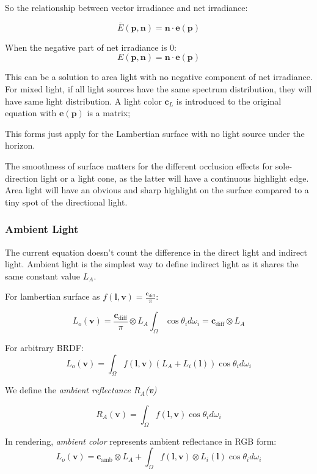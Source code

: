 \documentclass[10pt, a4paper]{article}
\begin{document}
        So the relationship between vector irradiance and net irradiance: 

        $$\overline{E}(\textbf{p}, \textbf{n}) = \textbf{n} \cdot \textbf{e}(\textbf{p})$$

        When the negative part of net irradiance is 0:
        $$E(\textbf{p}, \textbf{n}) = \textbf{n} \cdot \textbf{e}(\textbf{p})$$
        
        This can be a solution to area light with no negative component of net irradiance. For mixed light, if all light sources have the same spectrum distribution, they will have same light distribution. A light color $\textbf{c}_L$ is introduced to the original equation with $\textbf{e}(\textbf{p})$ is a matrix; 

        This forms just apply for the Lambertian surface with no light source under the horizon. 

        The smoothness of surface matters for the different occlusion effects for sole-direction light or a light cone, as the latter will have a continuous highlight edge. Area light will have an obvious and sharp highlight on the surface compared to a tiny spot of the directional light.
    
    \subsubsection{Ambient Light}
        The current equation doesn't count the difference in the direct light and indirect light. Ambient light is the simplest way to define indirect light as it shares the same constant value $L_A$.

        For lambertian surface as $f(\textbf{l}, \textbf{v}) = \frac{\textbf{c}_{\text{diff}}}{\pi}$: 

        $$L_o(\textbf{v}) = \frac{\textbf{c}_{\text{diff}}}{\pi} \otimes L_A\int_{\Omega}\cos{\theta_i}d\omega_i  = \textbf{c}_{\text{diff}} \otimes L_A$$
           
        For arbitrary BRDF: 
        $$
            L_o(\textbf{v}) = \int_{\Omega}f(\textbf{l}, \textbf{v})(L_A + L_i(\textbf{l}))\cos{\theta_i}d\omega_i
        $$

        We define the \emph{ambient reflectance $R_A$(\textbf{v})}

        $$R_A(\textbf{v}) = \int_{\Omega}f(\textbf{l}, \textbf{v})\cos{\theta_i}d\omega_i$$

        In rendering, \emph{ambient color} represents ambient reflectance in RGB form: 
        $$
        L_o(\textbf{v}) = \textbf{c}_{\text{amb}} \otimes L_A  + \int_{\Omega}f(\textbf{l}, \textbf{v}) \otimes L_i(\textbf{l})\cos{\theta_i}d\omega_i
    $$
\end{document}
